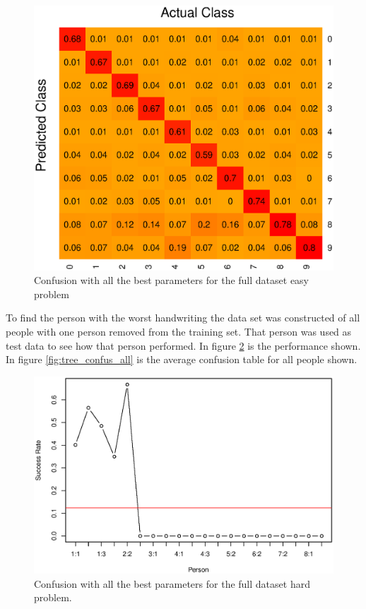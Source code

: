 \begin{figure}[H]
\centering
\includegraphics[width=\textwidth]{graphics/tree_confusion_mix}
\caption{Confusion with all the best parameters for the full dataset easy problem}
\label{fig:tree_confus_mixed}
\end{figure}


To find the person with the worst handwriting the data set was constructed of all people with one person removed from the training set.
That person was used as test data to see how that person performed.
In figure \ref{fig:tree_performance_all} is the performance shown.
In figure \ref{fig:tree_confus_all} is the average confusion table for all people shown.

\begin{figure}[H]
\centering
\includegraphics[width=\textwidth]{graphics/tree_performance_all}
\caption{Confusion with all the best parameters for the full dataset hard problem.}
\label{fig:tree_performance_all}
\end{figure}

